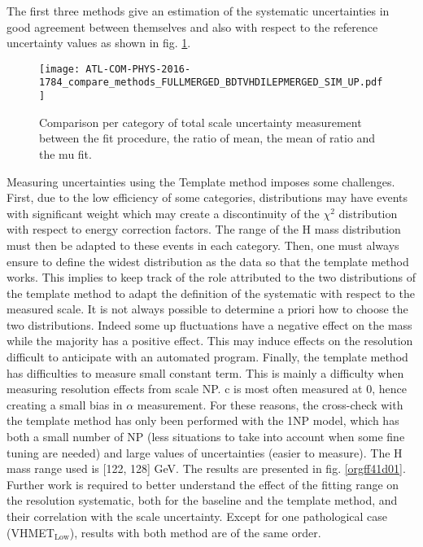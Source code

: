 \begin{enumerate}
\begin{enumerate}
The first three methods give an estimation of the systematic uncertainties in good agreement between themselves and also with respect to the reference uncertainty values as shown in fig. \ref{fig:org41d73b3}.

\begin{figure}[htbp]
\centering
\texttt{[image: ATL-COM-PHYS-2016-1784\_compare\_methods\_FULLMERGED\_BDTVHDILEPMERGED\_SIM\_UP.pdf]}
\caption{\label{fig:org41d73b3}
Comparison per category of total scale uncertainty measurement between the fit procedure, the ratio of mean, the mean of ratio and the mu fit.}
\end{figure}

Measuring uncertainties using the Template method imposes some challenges.
First, due to the low efficiency of some categories, distributions may have events with significant weight which may create a discontinuity of the \(\chi^{\text{2}}\) distribution with respect to energy correction factors.
The range of the H mass distribution must then be adapted to these events in each category.
Then, one must always ensure to define the widest distribution as the data so that the template method works.
This implies to keep track of the role attributed to the two distributions of the template method to adapt the definition of the systematic with respect to the measured scale.
It is not always possible to determine a priori how to choose the two distributions.
Indeed some up fluctuations have a negative effect on the mass while the majority has a positive effect.
This may induce effects on the resolution difficult to anticipate with an automated program.
Finally, the template method has difficulties to measure small constant term.
This is mainly a difficulty when measuring resolution effects from scale NP.
c is most often measured at 0, hence creating a small bias in $\alpha$ measurement.
For these reasons, the cross-check with the template method has only been performed with the 1NP model, which has both a small number of NP (less situations to take into account when some fine tuning are needed) and large values of uncertainties (easier to measure).
The H mass range used is [122, 128] GeV.
The results are presented in fig. \ref{orgff41d01}.
Further work is required to better understand the effect of the fitting range on the resolution systematic, both for the baseline and the template method, and their correlation with the scale uncertainty.
Except for one pathological case (VHMET\(_{\text{Low}}\)), results with both method are of the same order.


\end{enumerate}
\end{enumerate}
